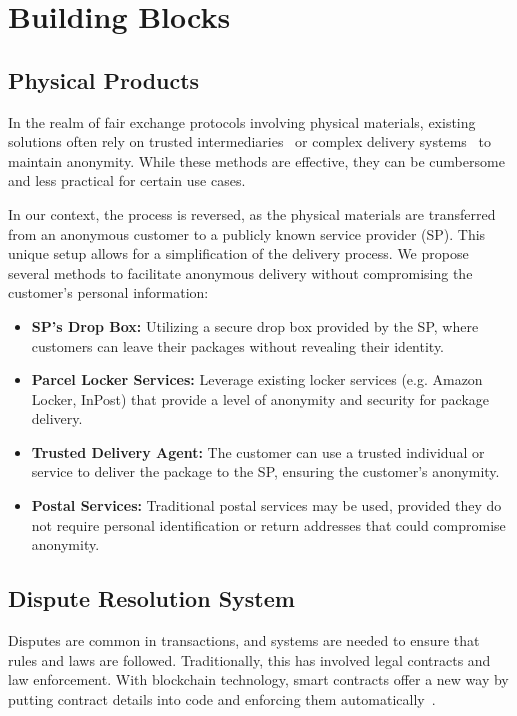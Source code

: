 \documentclass[pdftex,twocolumn,epjc3]{svjour3}
\begin{document}
\section{Building Blocks}\label{sec:building-blocks}

\subsection{Physical Products}\label{sec:physical-products}
In the realm of fair exchange protocols involving physical materials, existing solutions often rely on trusted intermediaries~\cite{mohammedalarajFairnessPhysicalProducts2012, birjoveanuAnonymityFairexchangeEcommerce2015} or complex delivery systems~\cite{altawyLelantosBlockchainBasedAnonymous2017} to maintain anonymity. While these methods are effective, they can be cumbersome and less practical for certain use cases.

In our context, the process is reversed, as the physical materials are transferred from an anonymous customer to a publicly known service provider (SP). This unique setup allows for a simplification of the delivery process. We propose several methods to facilitate anonymous delivery without compromising the customer's personal information:

\begin{itemize}
    \item \textbf{SP's Drop Box:} Utilizing a secure drop box provided by the SP, where customers can leave their packages without revealing their identity.
    
    \item \textbf{Parcel Locker Services:} Leverage existing locker services (e.g. Amazon Locker, InPost) that provide a level of anonymity and security for package delivery.
    
    \item \textbf{Trusted Delivery Agent:} The customer can use a trusted individual or service to deliver the package to the SP, ensuring the customer's anonymity.
    
    \item \textbf{Postal Services:} Traditional postal services may be used, provided they do not require personal identification or return addresses that could compromise anonymity.
\end{itemize}

\subsection{Dispute Resolution System}
\label{sec:dispute-resolution}
\begin{sloppypar}
Disputes are common in transactions, and systems are needed to ensure that rules and laws are followed. Traditionally, this has involved legal contracts and law enforcement. With blockchain technology, smart contracts offer a new way by putting contract details into code and enforcing them automatically~\cite{allenGovernanceBlockchainDispute2019}.
\end{sloppypar}
\end{document}
